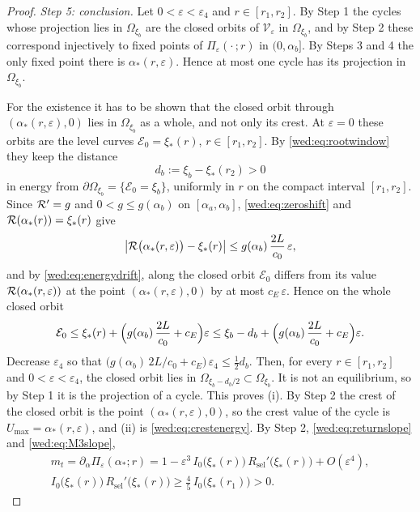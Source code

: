\begin{proof}
\emph{Step 5: conclusion.} Let $0<\varepsilon<\varepsilon_4$ and $r\in[r_1,r_2]$. By Step 1 the cycles whose projection lies in $\Omega_{\xi_b}$ are the closed orbits of $\mathcal V_\varepsilon$ in $\Omega_{\xi_b}$, and by Step 2 these correspond injectively to fixed points of $\Pi_\varepsilon(\cdot\,;r)$ in $(0,\alpha_b]$. By Steps 3 and 4 the only fixed point there is $\alpha_*(r,\varepsilon)$. Hence at most one cycle has its projection in $\Omega_{\xi_b}$.

For the existence it has to be shown that the closed orbit through $(\alpha_*(r,\varepsilon),0)$ lies in $\Omega_{\xi_b}$ as a whole, and not only its crest. At $\varepsilon=0$ these orbits are the level curves $\mathcal E_0=\xi_*(r)$, $r\in[r_1,r_2]$. By \eqref{wed:eq:rootwindow} they keep the distance
\[
d_b:=\xi_b-\xi_*(r_2)>0
\]
in energy from $\partial\Omega_{\xi_b}=\{\mathcal E_0=\xi_b\}$, uniformly in $r$ on the compact interval $[r_1,r_2]$. Since $\mathcal R'=g$ and $0<g\le g(\alpha_b)$ on $[\alpha_a,\alpha_b]$, \eqref{wed:eq:zeroshift} and $\mathcal R(\alpha_*(r))=\xi_*(r)$ give
\begin{equation}\label{wed:eq:crestenergy}
\bigl|\mathcal R\bigl(\alpha_*(r,\varepsilon)\bigr)-\xi_*(r)\bigr|\le g(\alpha_b)\,\frac{2L}{c_0}\,\varepsilon ,
\end{equation}
and by \eqref{wed:eq:energydrift}, along the closed orbit $\mathcal E_0$ differs from its value $\mathcal R(\alpha_*(r,\varepsilon))$ at the point $(\alpha_*(r,\varepsilon),0)$ by at most $c_E\,\varepsilon$. Hence on the whole closed orbit
\[
\mathcal E_0\le\xi_*(r)+\Bigl(g(\alpha_b)\,\frac{2L}{c_0}+c_E\Bigr)\varepsilon\le\xi_b-d_b+\Bigl(g(\alpha_b)\,\frac{2L}{c_0}+c_E\Bigr)\varepsilon .
\]
Decrease $\varepsilon_4$ so that $\bigl(g(\alpha_b)\,2L/c_0+c_E\bigr)\,\varepsilon_4\le\tfrac12d_b$. Then, for every $r\in[r_1,r_2]$ and $0<\varepsilon<\varepsilon_4$, the closed orbit lies in $\Omega_{\xi_b-d_b/2}\subset\Omega_{\xi_b}$. It is not an equilibrium, so by Step 1 it is the projection of a cycle. This proves (i). By Step 2 the crest of the closed orbit is the point $(\alpha_*(r,\varepsilon),0)$, so the crest value of the cycle is $U_{\max}=\alpha_*(r,\varepsilon)$, and (ii) is \eqref{wed:eq:crestenergy}. By Step 2, \eqref{wed:eq:returnslope} and \eqref{wed:eq:M3slope},
\begin{gather*}
m_t=\partial_\alpha\Pi_\varepsilon(\alpha_*;r)=1-\varepsilon^3\,I_0\bigl(\xi_*(r)\bigr)\,R_{\mathrm{sel}}'\bigl(\xi_*(r)\bigr)+O(\varepsilon^4),\\
I_0\bigl(\xi_*(r)\bigr)\,R_{\mathrm{sel}}'\bigl(\xi_*(r)\bigr)\ge\tfrac45\,I_0\bigl(\xi_*(r_1)\bigr)>0 .

\end{gather*}
\end{proof}
